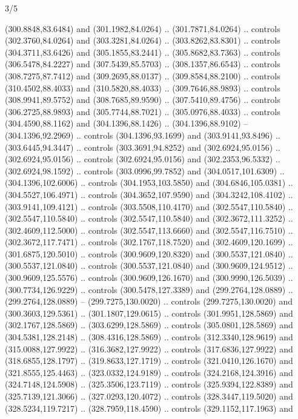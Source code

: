 \begin{flagdescription}{3/5}
\begin{scope}[xshift=0.5\flaglength,yshift=0.5\flagwidth,scale=\flagwidth/270]
\begin{scope}[y=0.8pt, x=0.8pt, yscale=-1,shift={(-281.25,-168.75)}]
  (300.8848,83.6484) and (301.1982,84.0264) .. (301.7871,84.0264) .. controls
  (302.3760,84.0264) and (303.3281,84.0264) .. (303.8262,83.8301) .. controls
  (304.3711,83.6426) and (305.1855,83.2441) .. (305.8682,83.7363) .. controls
  (306.5478,84.2227) and (307.5439,85.5703) .. (308.1357,86.6543) .. controls
  (308.7275,87.7412) and (309.2695,88.0137) .. (309.8584,88.2100) .. controls
  (310.4502,88.4033) and (310.5820,88.4033) .. (309.7646,88.9893) .. controls
  (308.9941,89.5752) and (308.7685,89.9590) .. (307.5410,89.4756) .. controls
  (306.2725,88.9893) and (305.7744,88.7021) .. (305.0976,88.4033) .. controls
  (304.4590,88.1162) and (304.1396,88.1426) .. (304.1396,88.9102) --
  (304.1396,92.2969) .. controls (304.1396,93.1699) and (303.9141,93.8496) ..
  (303.6445,94.3447) .. controls (303.3691,94.8252) and (302.6924,95.0156) ..
  (302.6924,95.0156) .. controls (302.6924,95.0156) and (302.2353,96.5332) ..
  (302.6924,98.1592) .. controls (303.0996,99.7852) and (304.0517,101.6309) ..
  (304.1396,102.6006) .. controls (304.1953,103.5850) and (304.6846,105.0381) ..
  (304.5527,106.4971) .. controls (304.3652,107.9590) and (304.3242,108.4102) ..
  (303.9141,109.4121) .. controls (303.5508,110.4170) and (302.5547,110.5840) ..
  (302.5547,110.5840) .. controls (302.5547,110.5840) and (302.3672,111.3252) ..
  (302.4609,112.5000) .. controls (302.5547,113.6660) and (302.5547,116.7510) ..
  (302.3672,117.7471) .. controls (302.1767,118.7520) and (302.4609,120.1699) ..
  (301.6875,120.5010) .. controls (300.9609,120.8320) and (300.5537,121.0840) ..
  (300.5537,121.0840) .. controls (300.5537,121.0840) and (300.9609,124.9512) ..
  (300.9609,125.5576) .. controls (300.9609,126.1670) and (300.9990,126.5039) ..
  (300.7734,126.9229) .. controls (300.5478,127.3389) and (299.2764,128.0889) ..
  (299.2764,128.0889) -- (299.7275,130.0020) .. controls (299.7275,130.0020) and
  (300.3603,129.5361) .. (301.1807,129.0615) .. controls (301.9951,128.5869) and
  (302.1767,128.5869) .. (303.6299,128.5869) .. controls (305.0801,128.5869) and
  (304.5381,128.2148) .. (308.4316,128.5869) .. controls (312.3340,128.9619) and
  (315.0088,127.9922) .. (316.3682,127.9922) .. controls (317.6836,127.9922) and
  (318.6855,128.1797) .. (319.8633,127.1719) .. controls (321.0410,126.1670) and
  (321.8555,125.4463) .. (323.0332,124.9189) .. controls (324.2168,124.3916) and
  (324.7148,124.5908) .. (325.3506,123.7119) .. controls (325.9394,122.8389) and
  (325.7139,121.3066) .. (327.0293,120.4072) .. controls (328.3447,119.5020) and
  (328.5234,119.7217) .. (328.7959,118.4590) .. controls (329.1152,117.1963) and

\end{scope}
\end{scope}
\end{flagdescription}
